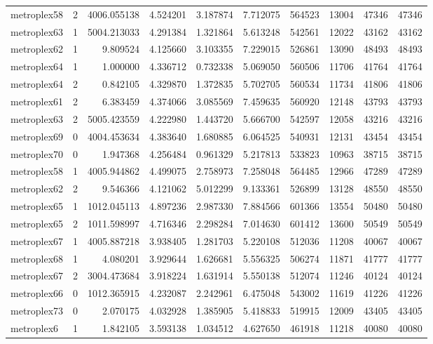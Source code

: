 \documentclass[../../../thesis.tex]{subfiles}
\begin{document}
\begin{longtable}{|l|r|r|r|r|r|r|r|r|r|}
metroplex58 & 2 & 4006.055138 & 4.524201 & 3.187874 & 7.712075 & 564523 & 13004 & 47346 & 47346 \\
metroplex63 & 1 & 5004.213033 & 4.291384 & 1.321864 & 5.613248 & 542561 & 12022 & 43162 & 43162 \\
metroplex62 & 1 & 9.809524 & 4.125660 & 3.103355 & 7.229015 & 526861 & 13090 & 48493 & 48493 \\
metroplex64 & 1 & 1.000000 & 4.336712 & 0.732338 & 5.069050 & 560506 & 11706 & 41764 & 41764 \\
metroplex64 & 2 & 0.842105 & 4.329870 & 1.372835 & 5.702705 & 560534 & 11734 & 41806 & 41806 \\
metroplex61 & 2 & 6.383459 & 4.374066 & 3.085569 & 7.459635 & 560920 & 12148 & 43793 & 43793 \\
metroplex63 & 2 & 5005.423559 & 4.222980 & 1.443720 & 5.666700 & 542597 & 12058 & 43216 & 43216 \\
metroplex69 & 0 & 4004.453634 & 4.383640 & 1.680885 & 6.064525 & 540931 & 12131 & 43454 & 43454 \\
metroplex70 & 0 & 1.947368 & 4.256484 & 0.961329 & 5.217813 & 533823 & 10963 & 38715 & 38715 \\
metroplex58 & 1 & 4005.944862 & 4.499075 & 2.758973 & 7.258048 & 564485 & 12966 & 47289 & 47289 \\
metroplex62 & 2 & 9.546366 & 4.121062 & 5.012299 & 9.133361 & 526899 & 13128 & 48550 & 48550 \\
metroplex65 & 1 & 1012.045113 & 4.897236 & 2.987330 & 7.884566 & 601366 & 13554 & 50480 & 50480 \\
metroplex65 & 2 & 1011.598997 & 4.716346 & 2.298284 & 7.014630 & 601412 & 13600 & 50549 & 50549 \\
metroplex67 & 1 & 4005.887218 & 3.938405 & 1.281703 & 5.220108 & 512036 & 11208 & 40067 & 40067 \\
metroplex68 & 1 & 4.080201 & 3.929644 & 1.626681 & 5.556325 & 506274 & 11871 & 41777 & 41777 \\
metroplex67 & 2 & 3004.473684 & 3.918224 & 1.631914 & 5.550138 & 512074 & 11246 & 40124 & 40124 \\
metroplex66 & 0 & 1012.365915 & 4.232087 & 2.242961 & 6.475048 & 543002 & 11619 & 41226 & 41226 \\
metroplex73 & 0 & 2.070175 & 4.032928 & 1.385905 & 5.418833 & 519915 & 12009 & 43405 & 43405 \\
metroplex6 & 1 & 1.842105 & 3.593138 & 1.034512 & 4.627650 & 461918 & 11218 & 40080 & 40080 \\

\end{longtable}
\end{document}
